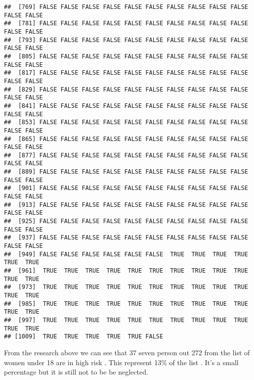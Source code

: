 \documentclass[
]{article}
\newenvironment{Shaded}{\begin{snugshade}}{\end{snugshade}}
\newcommand{\FunctionTok}[1]{\textcolor[rgb]{0.00,0.00,0.00}{#1}}
\newcommand{\NormalTok}[1]{#1}
\newcommand{\OtherTok}[1]{\textcolor[rgb]{0.56,0.35,0.01}{#1}}
\newcommand{\SpecialCharTok}[1]{\textcolor[rgb]{0.00,0.00,0.00}{#1}}
\newcommand{\StringTok}[1]{\textcolor[rgb]{0.31,0.60,0.02}{#1}}
\begin{document}
\begin{verbatim}
##  [769] FALSE FALSE FALSE FALSE FALSE FALSE FALSE FALSE FALSE FALSE FALSE FALSE
##  [781] FALSE FALSE FALSE FALSE FALSE FALSE FALSE FALSE FALSE FALSE FALSE FALSE
##  [793] FALSE FALSE FALSE FALSE FALSE FALSE FALSE FALSE FALSE FALSE FALSE FALSE
##  [805] FALSE FALSE FALSE FALSE FALSE FALSE FALSE FALSE FALSE FALSE FALSE FALSE
##  [817] FALSE FALSE FALSE FALSE FALSE FALSE FALSE FALSE FALSE FALSE FALSE FALSE
##  [829] FALSE FALSE FALSE FALSE FALSE FALSE FALSE FALSE FALSE FALSE FALSE FALSE
##  [841] FALSE FALSE FALSE FALSE FALSE FALSE FALSE FALSE FALSE FALSE FALSE FALSE
##  [853] FALSE FALSE FALSE FALSE FALSE FALSE FALSE FALSE FALSE FALSE FALSE FALSE
##  [865] FALSE FALSE FALSE FALSE FALSE FALSE FALSE FALSE FALSE FALSE FALSE FALSE
##  [877] FALSE FALSE FALSE FALSE FALSE FALSE FALSE FALSE FALSE FALSE FALSE FALSE
##  [889] FALSE FALSE FALSE FALSE FALSE FALSE FALSE FALSE FALSE FALSE FALSE FALSE
##  [901] FALSE FALSE FALSE FALSE FALSE FALSE FALSE FALSE FALSE FALSE FALSE FALSE
##  [913] FALSE FALSE FALSE FALSE FALSE FALSE FALSE FALSE FALSE FALSE FALSE FALSE
##  [925] FALSE FALSE FALSE FALSE FALSE FALSE FALSE FALSE FALSE FALSE FALSE FALSE
##  [937] FALSE FALSE FALSE FALSE FALSE FALSE FALSE FALSE FALSE FALSE FALSE FALSE
##  [949] FALSE FALSE FALSE FALSE FALSE FALSE  TRUE  TRUE  TRUE  TRUE  TRUE  TRUE
##  [961]  TRUE  TRUE  TRUE  TRUE  TRUE  TRUE  TRUE  TRUE  TRUE  TRUE  TRUE  TRUE
##  [973]  TRUE  TRUE  TRUE  TRUE  TRUE  TRUE  TRUE  TRUE  TRUE  TRUE  TRUE  TRUE
##  [985]  TRUE  TRUE  TRUE  TRUE  TRUE  TRUE  TRUE  TRUE  TRUE  TRUE  TRUE  TRUE
##  [997]  TRUE  TRUE  TRUE  TRUE  TRUE  TRUE  TRUE  TRUE  TRUE  TRUE  TRUE  TRUE
## [1009]  TRUE  TRUE  TRUE  TRUE  TRUE FALSE
\end{verbatim}

\begin{Shaded}
\end{Shaded}

From the research above we can see that 37 seven person out 272 from the
list of women under 18 are in high risk . This represent 13\% of the
list . It's a small percentage but it is still not to be be neglected.
\end{document}

